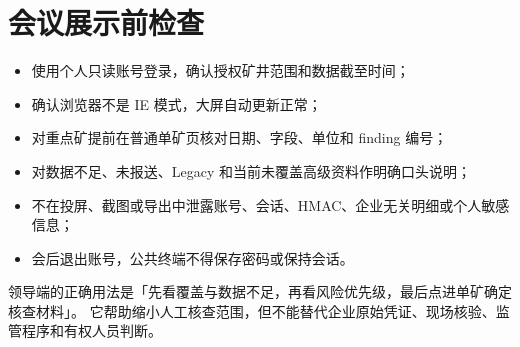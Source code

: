\documentclass[UTF8,openany,zihao=-4,fontset=none]{ctexbook}
\begin{document}
\section{会议展示前检查}

\begin{itemize}
  \item 使用个人只读账号登录，确认授权矿井范围和数据截至时间；
  \item 确认浏览器不是 IE 模式，大屏自动更新正常；
  \item 对重点矿提前在普通单矿页核对日期、字段、单位和 finding 编号；
  \item 对数据不足、未报送、Legacy 和当前未覆盖高级资料作明确口头说明；
  \item 不在投屏、截图或导出中泄露账号、会话、HMAC、企业无关明细或个人敏感信息；
  \item 会后退出账号，公共终端不得保存密码或保持会话。
\end{itemize}

\begin{importantbox}
领导端的正确用法是「先看覆盖与数据不足，再看风险优先级，最后点进单矿确定核查材料」。
它帮助缩小人工核查范围，但不能替代企业原始凭证、现场核验、监管程序和有权人员判断。
\end{importantbox}
\end{document}
